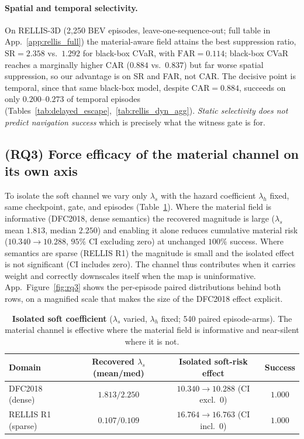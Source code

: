 \paragraph{Spatial and temporal selectivity.}
On RELLIS-3D (2{,}250 BEV episodes, leave-one-sequence-out; full table in App.~\ref{app:rellis_full}) the material-aware field attains the best suppression ratio, $\mathrm{SR}=2.358$ vs.\ $1.292$ for black-box CVaR, with $\mathrm{FAR}=0.114$; black-box CVaR reaches a marginally higher CAR ($0.884$ vs.\ $0.837$) but far worse spatial suppression, so our advantage is on SR and FAR, not CAR. The decisive point is temporal, since that same black-box model, despite $\mathrm{CAR}=0.884$, succeeds on only $0.200$--$0.273$ of temporal episodes (Tables~\ref{tab:delayed_escape},~\ref{tab:rellis_dyn_agg}). \emph{Static selectivity does not predict navigation success}  which is precisely what the witness gate is for.

\subsection{(RQ3) Force efficacy of the material channel on its own axis}
\label{sec:exp_dfc}

To isolate the soft channel we vary only $\lambda_s$ with the hazard coefficient $\lambda_h$ fixed, same checkpoint, gate, and episodes (Table~\ref{tab:one_factor}). Where the material field is informative (DFC2018, dense semantics) the recovered magnitude is large ($\lambda_s$ mean $1.813$, median $2.250$) and enabling it alone reduces cumulative material risk ($10.340\!\to\!10.288$, $95\%$ CI excluding zero) at unchanged $100\%$ success. Where semantics are sparse (RELLIS R1) the magnitude is small and the isolated effect is not significant (CI includes zero). The channel thus contributes when it carries weight and correctly downscales itself when the map is uninformative. App.~Figure~\ref{fig:rq3} shows the per-episode paired distributions behind both rows, on a magnified scale that makes the size of the DFC2018 effect explicit.

\begin{table}[t]
\centering
\caption{\textbf{Isolated soft coefficient} ($\lambda_s$ varied, $\lambda_h$ fixed; 540 paired episode-arms). The material channel is effective where the material field is informative and near-silent where it is not.}
\label{tab:one_factor}
\small
\setlength{\tabcolsep}{6pt}\renewcommand{\arraystretch}{1.1}
\begin{tabular}{lccc}
\toprule
Domain & Recovered $\lambda_s$ (mean/med) & Isolated soft-risk effect & Success \\
\midrule
DFC2018 (dense)    & $1.813 / 2.250$ & $10.340\!\to\!10.288$ (CI excl.\ 0) & $1.000$ \\
RELLIS R1 (sparse) & $0.107 / 0.109$ & $16.764\!\to\!16.763$ (CI incl.\ 0) & $1.000$ \\
\bottomrule
\end{tabular}
\end{table}

